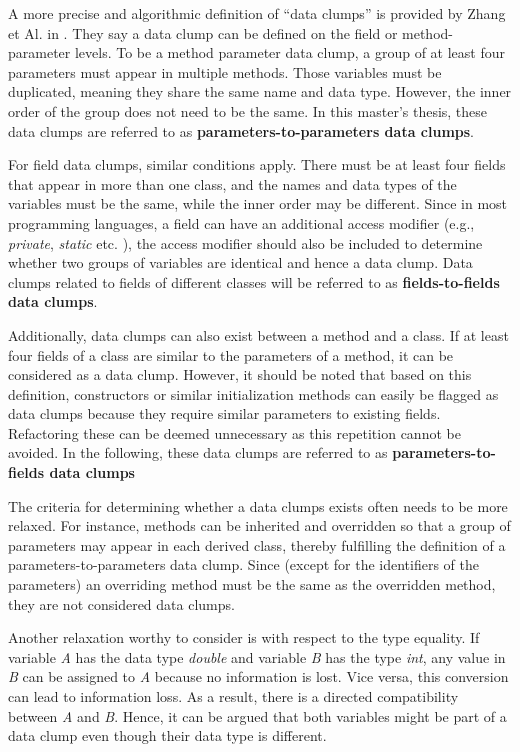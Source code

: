 A more precise and algorithmic definition of \enquote{data clumps} is provided by Zhang et Al. in  \cite{zhangImprovingPrecisionFowler2008}. They say a data clump can be defined on the field or method-parameter levels. 
To be a method parameter data clump, a group of at least four parameters must appear in multiple methods. Those variables must be duplicated, meaning they share the same name and data type. However, the inner order of the group does not need to be the same. In this master's thesis, these data clumps are referred to as \textbf{parameters-to-parameters data clumps}.

For field data clumps, similar conditions apply. There must be at least four fields that appear in more than one class, and the names and data types of the variables must be the same, while the inner order may be different. Since in most programming languages, a field can have an additional access modifier (e.g., \textit{private}, \textit{static} etc. ), the access modifier should also be included to determine whether two groups of variables are identical and hence a data clump.  Data clumps related to fields of different classes will be referred to as \textbf{fields-to-fields data clumps}.

Additionally, data clumps can also exist between a method and a class. If at least four fields of a class are similar to the parameters of a method, it can be considered as a data clump. However, it should be noted that based on this definition, constructors or similar initialization methods can easily be flagged as data clumps because they require similar parameters to existing fields. Refactoring these can be deemed unnecessary as this repetition cannot be avoided. 
 In the following, these data clumps are referred to as \textbf{parameters-to-fields data clumps}


The criteria for determining whether a data clumps exists often needs to be more relaxed. For instance, methods can be inherited and overridden so that a group of parameters may appear in each derived class, thereby fulfilling the definition of a  parameters-to-parameters data clump. Since (except for the identifiers of the parameters) an overriding method must be the same as the overridden method, they are not considered data clumps.


Another relaxation worthy to consider is with respect to the type equality. If variable \textit{A} has the data type \textit{double} and variable \textit{B} has the type \textit{int}, any value in \textit{B} can be assigned to \textit{A} because no information is lost. Vice versa, this conversion can lead to information loss. As a result, there is a directed compatibility between \textit{A} and \textit{B}. Hence, it can be argued that both variables might be part of a data clump even though their data type is different. 


